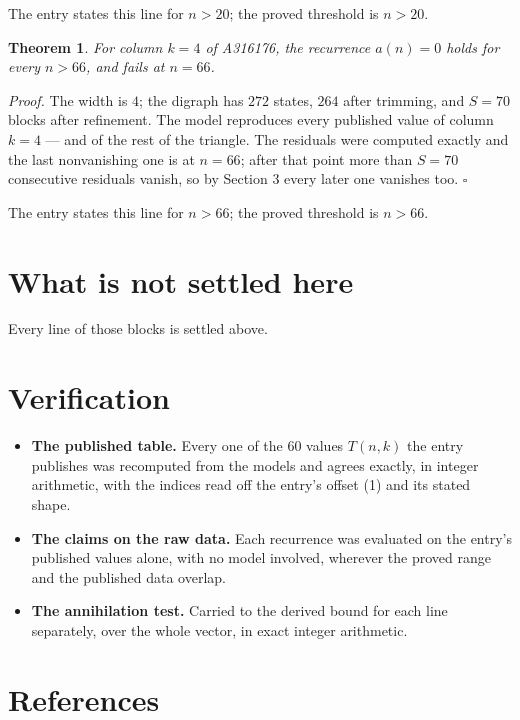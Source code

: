\documentclass[11pt]{article}
\newtheorem{theorem}{Theorem}
\theoremstyle{definition}
\begin{document}
The entry states this line for $n > 20$; the proved threshold is $n > 20$.

\begin{theorem} For column $k = 4$ of A316176, the recurrence $a(n) = 0$ holds for every $n > 66$, and fails at $n = 66$.\end{theorem}

{\itshape Proof.} The width is $4$; the digraph has $272$ states, $264$ after trimming, and $S = 70$ blocks after refinement. The model reproduces every published value of column $k = 4$ --- and of the rest of the triangle. The residuals were computed exactly and the last nonvanishing one is at $n = 66$; after that point more than $S = 70$ consecutive residuals vanish, so by Section 3 every later one vanishes too. $\square$

The entry states this line for $n > 66$; the proved threshold is $n > 66$.

\section{What is not settled here}

Every line of those blocks is settled above.

\section{Verification}

\begin{itemize}

\item {\bfseries The published table.} Every one of the 60 values $T(n,k)$ the entry publishes was recomputed from the models and agrees exactly, in integer arithmetic, with the indices read off the entry's offset (1) and its stated shape.

\item {\bfseries The claims on the raw data.} Each recurrence was evaluated on the entry's published values alone, with no model involved, wherever the proved range and the published data overlap.

\item {\bfseries The annihilation test.} Carried to the derived bound for each line separately, over the whole vector, in exact integer arithmetic.

\end{itemize}

\section{References}
\end{document}
